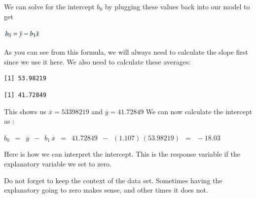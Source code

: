 \documentclass[
  letterpaper,
  DIV=11,
  numbers=noendperiod]{scrreprt}
\newenvironment{Shaded}{\begin{snugshade}}{\end{snugshade}}
\newcommand{\CommentTok}[1]{\textcolor[rgb]{0.37,0.37,0.37}{#1}}
\newcommand{\FunctionTok}[1]{\textcolor[rgb]{0.28,0.35,0.67}{#1}}
\newcommand{\NormalTok}[1]{\textcolor[rgb]{0.00,0.23,0.31}{#1}}
\newcommand{\OtherTok}[1]{\textcolor[rgb]{0.00,0.23,0.31}{#1}}
\newcommand{\SpecialCharTok}[1]{\textcolor[rgb]{0.37,0.37,0.37}{#1}}
\begin{document}
We can solve for the intercept \(b_0\) by plugging these values back
into our model to get

\includegraphics[width=0.15\textwidth,height=\textheight]{./images/LMR_5.jpg}

As you can see from this formula, we will always need to calculate the
slope first since we use it here. We also need to calculate these
averages:

\begin{Shaded}
\end{Shaded}

\begin{verbatim}
[1] 53.98219
\end{verbatim}

\begin{Shaded}
\end{Shaded}

\begin{verbatim}
[1] 41.72849
\end{verbatim}

This shows us \(\overline{x} = 53398219\) and
\(\overline{y} = 41.72849\) We can now calculate the intercept as :

\(\displaystyle{b_0\,\,\, = \,\,\, \overline{y} \,\,\, -\,\,\,b_1 \,
\overline{x}\,\,\, =\,\,\, 41.72849\,\,\, - \,\,\, (1.107)\,(53.98219)\,\,\, =
\,\,\,-18.03}\)

\begin{tcolorbox}[enhanced jigsaw, breakable, arc=.35mm, leftrule=.75mm, toprule=.15mm, titlerule=0mm, coltitle=black, colframe=quarto-callout-tip-color-frame, left=2mm, opacitybacktitle=0.6, rightrule=.15mm, bottomrule=.15mm, colback=white, toptitle=1mm, opacityback=0, title=\textcolor{quarto-callout-tip-color}{\faLightbulb}\hspace{0.5em}{Interpreting the Intercept}, bottomtitle=1mm, colbacktitle=quarto-callout-tip-color!10!white]

Here is how we can interpret the intercept. This is the response
variable if the explanatory variable we set to zero.

Do not forget to keep the context of the data set. Sometimes having the
explanatory going to zero makes sense, and other times it does not.

\end{tcolorbox}
\end{document}
